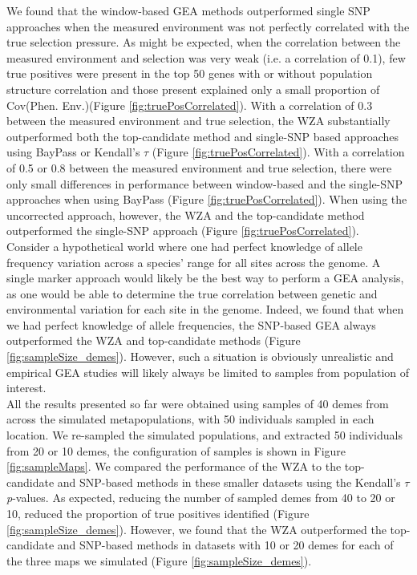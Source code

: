 \documentclass[10pt,twoside,lineno]{GSA_format}
\begin{document}
We found that the window-based GEA methods outperformed single SNP approaches when the measured environment was not perfectly correlated with the true selection pressure. As might be expected, when the correlation between the measured environment and selection was very weak (i.e. a correlation of 0.1), few true positives were present in the top 50 genes with or without population structure correlation and those present explained only a small proportion of Cov(Phen. Env.)(Figure \ref{fig:truePosCorrelated}). With a correlation of 0.3 between the measured environment and true selection, the WZA substantially outperformed both the top-candidate method and single-SNP based approaches using BayPass or Kendall's $\tau$ (Figure \ref{fig:truePosCorrelated}). With a correlation of 0.5 or 0.8 between the measured environment and true selection, there were only small differences in performance between window-based and the single-SNP approaches when using BayPass (Figure \ref{fig:truePosCorrelated}). When using the uncorrected approach, however, the WZA and the top-candidate method outperformed the single-SNP approach (Figure \ref{fig:truePosCorrelated}). \\

Consider a hypothetical world where one had perfect knowledge of allele frequency variation across a species' range for all sites across the genome. A single marker approach would likely be the best way to perform a GEA analysis, as one would be able to determine the true correlation between genetic and environmental variation for each site in the genome. Indeed, we found that when we had perfect knowledge of allele frequencies, the SNP-based GEA always outperformed the WZA and top-candidate methods (Figure \ref{fig:sampleSize_demes}). However, such a situation is obviously unrealistic and empirical GEA studies will likely always be limited to samples from population of interest. \\

All the results presented so far were obtained using samples of 40 demes from across the simulated metapopulations, with 50 individuals sampled in each location. We re-sampled the simulated populations, and extracted 50 individuals from 20 or 10 demes, the configuration of samples is shown in Figure \ref{fig:sampleMaps}. We compared the performance of the WZA to the top-candidate and SNP-based methods in these smaller datasets using the Kendall's $\tau$ \textit{p}-values. As expected, reducing the number of sampled demes from 40 to 20 or 10, reduced the proportion of true positives identified (Figure \ref{fig:sampleSize_demes}). However, we found that the WZA outperformed the top-candidate and SNP-based methods in datasets with 10 or 20 demes for each of the three maps we simulated (Figure \ref{fig:sampleSize_demes}). \\
\end{document}
